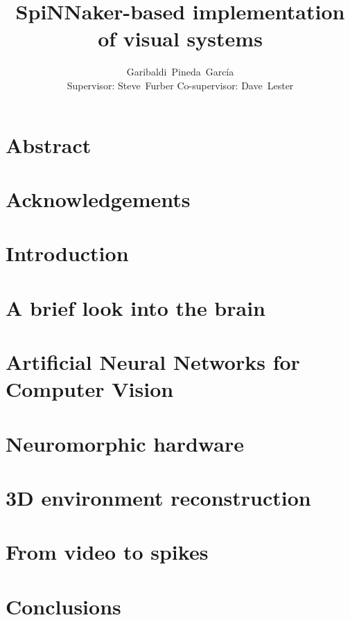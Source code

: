 \documentclass[a4paper]{memoir}
\title{SpiNNaker-based implementation of visual systems}
\author{Garibaldi~Pineda~García \\ Supervisor: Steve~Furber Co-supervisor: Dave~Lester}
\date{}
\begin{document}
  \thispagestyle{empty}
  

  \cleardoublepage
  \tableofcontents
  \cleardoublepage

\chapter*{Abstract}
\label{abstract}


\chapter*{Acknowledgements}
\label{acknowledgements}


\pagestyle{ruled}

  \chapter{Introduction}
  
  \label{chp:intro}

  \chapter{A brief look into the brain}
  \label{chp:brain}
  

  \chapter{Artificial Neural Networks for Computer Vision}
  \label{chp:vision}
  

  \chapter{Neuromorphic hardware}
  \label{chp:neuro-hw}
  

  \chapter{3D environment reconstruction}
  \label{chp:reconstruction}
  


  \chapter{From video to spikes}
  \label{chp:img2spk}
  

  \chapter{Conclusions}
  \label{chp:conclusions}
  

  \printbibliography
\end{document}
